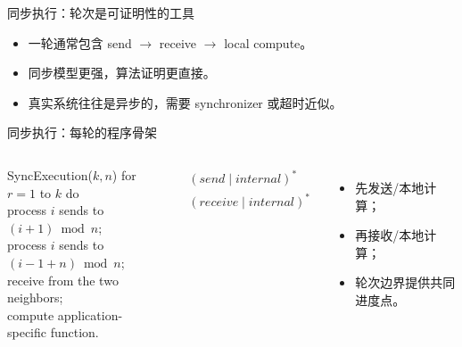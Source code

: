 \documentclass[UTF8,fontset=none,aspectratio=169,10pt]{beamer}
\begin{document}
\begin{frame}{同步执行：轮次是可证明性的工具}
\begin{center}\end{center}
\vfill\begin{itemize}\item 一轮通常包含 send $\rightarrow$ receive $\rightarrow$ local compute。\item 同步模型更强，算法证明更直接。\item 真实系统往往是异步的，需要 synchronizer 或超时近似。\end{itemize}
\end{frame}

\begin{frame}{同步执行：每轮的程序骨架}
\begin{columns}[T,onlytextwidth]
\begin{block}{SyncExecution($k,n$)}
\ttfamily\small
for $r=1$ to $k$ do\\
\quad process $i$ sends to $(i+1)\bmod n$;\\
\quad process $i$ sends to $(i-1+n)\bmod n$;\\
\quad receive from the two neighbors;\\
\quad compute application-specific function.
\end{block}
{\scriptsize
\[
\begin{aligned}
 &(send\mid internal)^*\\[-1mm]
 &(receive\mid internal)^*
\end{aligned}
\]}
\begin{itemize}
  \item 先发送/本地计算；
  \item 再接收/本地计算；
  \item 轮次边界提供共同进度点。
\end{itemize}
\end{columns}
\end{frame}
\end{document}
